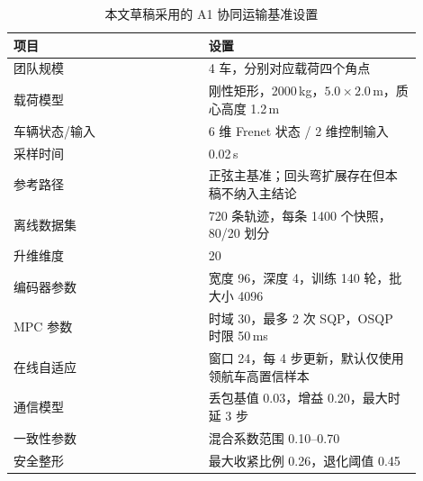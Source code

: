 \documentclass[twocolumn,3p,times,procedia]{elsarticle}
\begin{document}
\begin{table}[h]
\footnotesize
\centering
\begin{threeparttable}
\setlength{\abovecaptionskip}{0pt}
\caption{本文草稿采用的 A1 协同运输基准设置}
\label{tab:zh_settings}
\begin{tabular}{p{0.43\linewidth} p{0.47\linewidth}}
\toprule
项目 & 设置 \\
\midrule
团队规模 & 4 车，分别对应载荷四个角点 \\
载荷模型 & 刚性矩形，2000\,kg，$5.0\times2.0$\,m，质心高度 1.2\,m \\
车辆状态/输入 & 6 维 Frenet 状态 / 2 维控制输入 \\
采样时间 & 0.02\,s \\
参考路径 & 正弦主基准；回头弯扩展存在但本稿不纳入主结论 \\
离线数据集 & 720 条轨迹，每条 1400 个快照，80/20 划分 \\
升维维度 & 20 \\
编码器参数 & 宽度 96，深度 4，训练 140 轮，批大小 4096 \\
MPC 参数 & 时域 30，最多 2 次 SQP，OSQP 时限 50\,ms \\
在线自适应 & 窗口 24，每 4 步更新，默认仅使用领航车高置信样本 \\
通信模型 & 丢包基值 0.03，增益 0.20，最大时延 3 步 \\
一致性参数 & 混合系数范围 0.10--0.70 \\
安全整形 & 最大收紧比例 0.26，退化阈值 0.45 \\
\bottomrule
\end{tabular}
\end{threeparttable}
\end{table}
\end{document}

